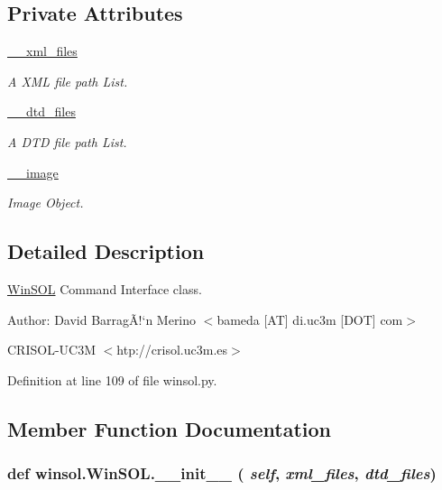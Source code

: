 \subsection*{Private Attributes}
\begin{CompactItemize}
\item 
\hyperlink{classwinsol_1_1WinSOL_8ab97ce31e17380f58e5f7a6dca8245e}{\_\-\_\-xml\_\-files}
\begin{CompactList}\small\item\em A XML file path List. \item\end{CompactList}\item 
\hyperlink{classwinsol_1_1WinSOL_8ed97ff01f8a93ddb672caebf196f2c8}{\_\-\_\-dtd\_\-files}
\begin{CompactList}\small\item\em A DTD file path List. \item\end{CompactList}\item 
\hyperlink{classwinsol_1_1WinSOL_b15200b7b5af8a9ac4faddf753ed0584}{\_\-\_\-image}
\begin{CompactList}\small\item\em Image Object. \item\end{CompactList}\end{CompactItemize}


\subsection{Detailed Description}
\hyperlink{classwinsol_1_1WinSOL}{Win\-SOL} Command Interface class. 

\begin{Desc}
\item[Author:]David Barrag\~{A}!`n Merino $<$bameda \mbox{[}AT\mbox{]} di.uc3m \mbox{[}DOT\mbox{]} com$>$ 

CRISOL-UC3M $<$htp://crisol.uc3m.es$>$ \end{Desc}




Definition at line 109 of file winsol.py.

\subsection{Member Function Documentation}
\hypertarget{classwinsol_1_1WinSOL_809bc149b22893566e211c08fb3aaacb}{
\subsubsection[\_\-\_\-init\_\-\_\-]{\setlength{\rightskip}{0pt plus 5cm}def winsol.Win\-SOL.\_\-\_\-init\_\-\_\- ( {\em self},  {\em xml\_\-files},  {\em dtd\_\-files})}}
\label{classwinsol_1_1WinSOL_809bc149b22893566e211c08fb3aaacb}


